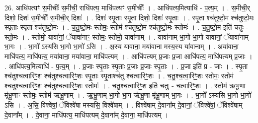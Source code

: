 \documentclass[17pt]{extarticle}
\begin{document}
26. आधि॑पत्यꣳ स॒मीचीः᳚ स॒मीची॒ राधि॑पत्य॒ माधि॑पत्यꣳ स॒मीचीः᳚ । . आधि॑पत्य॒मित्याधि॑ - प॒त्य॒म् । . स॒मीची॒र् दिशो॒ दिशः॑ स॒मीचीः᳚ स॒मीची॒र् दिशः॑ । . दिशः॑ स्पृ॒ताः स्पृ॒ता दिशो॒ दिशः॑ स्पृ॒ताः । . स्पृ॒ता श्च॑तुष्टो॒म श्च॑तुष्टो॒मः स्पृ॒ताः स्पृ॒ता श्च॑तुष्टो॒मः । . च॒तु॒ष्टो॒मः स्तोमः॒ स्तोम॑ श्चतुष्टो॒म श्च॑तुष्टो॒मः स्तोमः॑ । . च॒तु॒ष्टो॒म इति॑ चतुः - स्तो॒मः । . स्तोमो॒ यावा॑नां॒ ॅयावा॑नाꣳ॒॒ स्तोमः॒ स्तोमो॒ यावा॑नाम् । . यावा॑नाम् भा॒गो भा॒गो यावा॑नां॒ ॅयावा॑नाम् भा॒गः । . भा॒गो᳚ ऽस्यसि भा॒गो भा॒गो॑ ऽसि । . अ॒स्य या॑वाना॒ मया॑वाना मस्य॒स्य या॑वानाम् । . अया॑वाना॒ माधि॑पत्य॒ माधि॑पत्य॒ मया॑वाना॒ मया॑वाना॒ माधि॑पत्यम् । . आधि॑पत्यम् प्र॒जाः प्र॒जा आधि॑पत्य॒ माधि॑पत्यम् प्र॒जाः । . आधि॑पत्य॒मित्याधि॑ - प॒त्य॒म् । . प्र॒जाः स्पृ॒ताः स्पृ॒ताः प्र॒जाः प्र॒जाः स्पृ॒ताः । . प्र॒जा इति॑ प्र - जाः । . स्पृ॒ता श्च॑तुश्चत्वारिꣳ॒॒श श्च॑तुश्चत्वारिꣳ॒॒शः स्पृ॒ताः स्पृ॒ताश्च॑तु श्चत्वारिꣳ॒॒शः । . च॒तु॒श्च॒त्वा॒रिꣳ॒॒शः स्तोमः॒ स्तोम॑ श्चतुश्चत्वारिꣳ॒॒श श्च॑तुश्चत्वारिꣳ॒॒शः स्तोमः॑ । . च॒तु॒श्च॒त्वा॒रिꣳ॒॒श इति॑ चतुः - च॒त्वा॒रिꣳ॒॒शः । . स्तोम॑ ऋभू॒णा मृ॑भू॒णाꣳ स्तोमः॒ स्तोम॑ ऋभू॒णाम् । . ऋ॒भू॒णाम् भा॒गो भा॒ग ऋ॑भू॒णा मृ॑भू॒णाम् भा॒गः । . भा॒गो᳚ ऽस्यसि भा॒गो भा॒गो॑ ऽसि । . अ॒सि॒ विश्वे॑षां॒ ॅविश्वे॑षा मस्यसि॒ विश्वे॑षाम् । . विश्वे॑षाम् दे॒वाना᳚म् दे॒वानां॒ ॅविश्वे॑षां॒ ॅविश्वे॑षाम् दे॒वाना᳚म् । . दे॒वाना॒ माधि॑पत्य॒ माधि॑पत्यम् दे॒वाना᳚म् दे॒वाना॒ माधि॑पत्यम् । \newline
\end{document}
